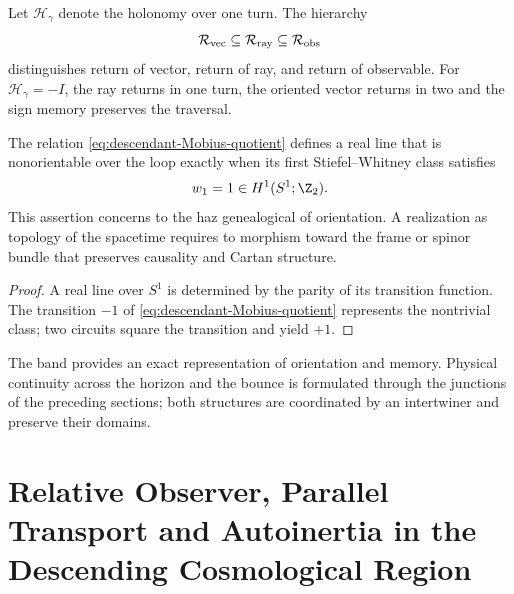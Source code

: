 Let \(\mathscr H_\gamma\) denote the holonomy over one turn. The hierarchy
\begin{equation}
 \mathcal R_{\rm vec}
 \subseteq\mathcal R_{\rm ray}
 \subseteq\mathcal R_{\rm obs}
 \label{eq:descendant-return-hierarchy}
\end{equation}
distinguishes return of vector, return of ray, and return of observable. For
\(\mathscr H_\gamma=-I\), the ray returns in one turn, the oriented vector
returns in two and the sign memory preserves the traversal.

\begin{proposition}
\label{prop:descendant-Mobius-status}
The relation \cref{eq:descendant-Mobius-quotient} defines a real line
that is nonorientable over the loop exactly when its first
Stiefel--Whitney class satisfies
\begin{equation}
 w_1=1\in H^1(S^1;\Z_2).
 \label{eq:descendant-w1}
\end{equation}
This assertion concerns to the haz genealogical of orientation. A
realization as topology of the spacetime requires to morphism toward
the frame or spinor bundle that preserves causality and Cartan structure.
\end{proposition}

\begin{proof}
A real line over \(S^1\) is determined by the parity of its
transition function. The transition \(-1\) of
\cref{eq:descendant-Mobius-quotient} represents the nontrivial class; two
circuits square the transition and yield \(+1\).
\end{proof}

The band provides an exact representation of orientation and memory.
Physical continuity across the horizon and the bounce is formulated
through the junctions of the preceding sections; both structures are
coordinated by an intertwiner and preserve their domains.

\section{Relative Observer, Parallel Transport and Autoinertia in the Descending Cosmological Region}

